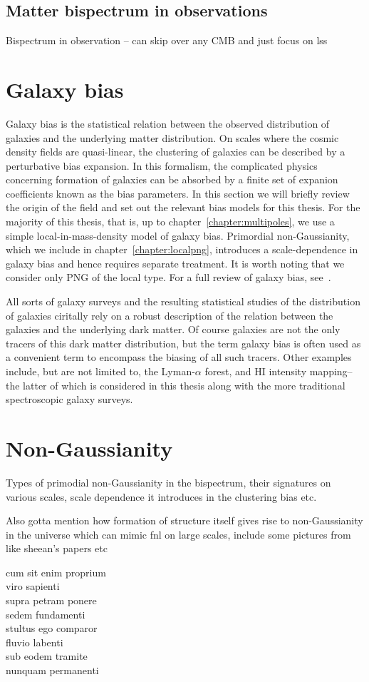 \subsection{Matter bispectrum in observations}

Bispectrum in observation -- can skip over any CMB and just focus on lss

\section{Galaxy bias}
\label{section:galaxybias}

Galaxy bias is the statistical relation between the observed distribution of galaxies and the underlying matter distribution. On scales where the cosmic density fields are quasi-linear, the clustering of galaxies can be described by a perturbative bias expansion. In this formalism, the complicated physics concerning formation of galaxies can be absorbed by a finite set of expanion coefficients known as the bias parameters. In this section we will briefly review the origin of the field and set out the relevant bias models for this thesis. For the majority of this thesis, that is, up to chapter~\ref{chapter:multipoles}, we use a simple local-in-mass-density model of galaxy bias. Primordial non-Gaussianity, which we include in chapter~\ref{chapter:localpng}, introduces a scale-dependence in galaxy bias and hence requires separate treatment. It is worth noting that we consider only PNG of the local type. For a full review of galaxy bias, see~\cite{Desjacques:2016bnm}.

All sorts of galaxy surveys and the resulting statistical studies of the distribution of galaxies ciritally rely on a robust description of the relation between the galaxies and the underlying dark matter. Of course galaxies are not the only tracers of this dark matter distribution, but the term galaxy bias is often used as a convenient term to encompass the biasing of all such tracers. Other examples include, but are not limited to, the Lyman-$\alpha$ forest, and HI intensity mapping-- the latter of which is considered in this thesis along with the more traditional spectroscopic galaxy surveys. 

\section{Non-Gaussianity}

Types of primodial non-Gaussianity in the bispectrum, their signatures on various scales, scale dependence it introduces in the clustering bias etc. 

Also gotta mention how formation of structure itself gives rise to non-Gaussianity in the universe which can mimic fnl on large scales, include some pictures from like sheean's papers etc


cum sit enim proprium \\
viro sapienti \\
supra petram ponere \\
sedem fundamenti \\
stultus ego comparor \\
fluvio labenti \\
sub eodem tramite \\
nunquam permanenti 